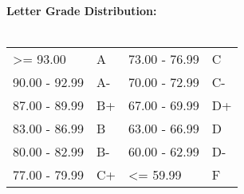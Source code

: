 \documentclass[11pt]{article}
\begin{document}
\textbf {Letter Grade Distribution:} \\\\
\hspace*{40mm}
\begin{tabular}{ l l | l l }
\textgreater= 93.00 & A & 73.00 - 76.99 & C \\
90.00 - 92.99 & A-  & 70.00 - 72.99 & C- \\
87.00 - 89.99 & B+  & 67.00 - 69.99 & D+ \\
83.00 - 86.99 & B  & 63.00 - 66.99 & D \\
80.00 - 82.99 & B-  & 60.00 - 62.99 & D- \\
77.00 - 79.99 & C+  & \textless= 59.99 & F \\
\end{tabular} \\
\end{document}
